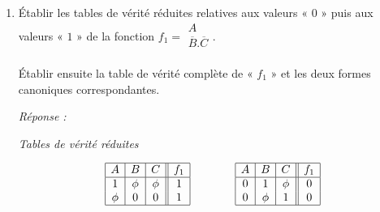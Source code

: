 \begin{enumerate} [label=\arabic*$^\circ$]
Simplifier la fonction « $I$ » par la mise en facteur, transposition et adjacences successives   et vérifier le résultat par la méthode de  « \textsc{Karnaugh} ». 

 
\emph{Réponse :}



\[ I = 
\begin{array}{|c|c|} \overline{A} & \overline{D} \\ B . \overline{C} & E . \overline{F}  \\     \end{array}
\]

\item   Établir les tables de vérité réduites relatives aux valeurs « $0$ » puis aux valeurs « $1$ » de la fonction $f_1 = \begin{array}{|c|} A \\ \overline{B} . \overline{C} \\ \end{array}$.  

Établir ensuite la table de vérité complète de « $f_1$ » et les deux formes canoniques correspondantes. 



 \emph{Réponse :}
 

\centerline{ \emph{Tables de vérité réduites}}
\[
 \begin{array}{|c|c|c||c|} 
 	\hline
 	A & B & C & f_1 \\
 	\hline 
 	1 & \phi & \phi & 1 \\
 	\phi & 0 & 0  & 1 \\
 	\hline 
  \end{array}
   \qquad \qquad   \begin{array}{|c|c|c||c|} 
 	\hline
 	A & B & C & f_1 \\
 	\hline 
 	0  & 1  & \phi & 0  \\
 	0 & \phi & 1 & 0  \\
 	\hline 
  \end{array}
 \]
 


\end{enumerate}
